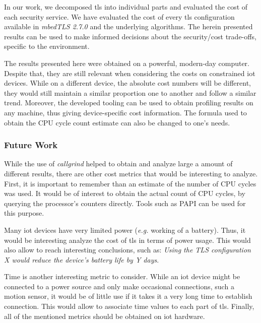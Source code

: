 \documentclass{llncs}
\begin{document}
In our work, we decomposed \gls{tls} into individual parts and evaluated the cost of each security service.
We have evaluated the cost of every \gls{tls} configuration available in \textit{mbedTLS 2.7.0} and the underlying
algorithms. The herein presented results can be used to make informed decisions about the security/cost trade-offs,
specific to the environment.

The results presented here were obtained on a powerful, modern-day computer. Despite that, they are still
relevant when considering the costs on constrained \gls{iot} devices. While on a different device, the absolute cost 
numbers will be different, they would still maintain a similar proportion one to another and follow a similar trend.
Moreover, the developed tooling can be used to obtain profiling results on any machine, thus giving device-specific 
cost information. The formula used to obtain the CPU cycle count estimate can also be changed to one's needs.

\subsubsection{Future Work}

While the use of \textit{callgrind} helped to obtain and analyze large a amount of different results, there are other
cost metrics that would be interesting to analyze. First, it is important to remember than an estimate of the number
of CPU cycles was used. It would be of interest to obtain the actual count of CPU cycles, by querying the
processor's counters directly. Tools such as PAPI\cite{dongarra2001using} can be used for this purpose.

Many \gls{iot} devices have very limited power (\textit{e.g.} working of a battery). Thus, it would be interesting
analyze the cost of \gls{tls} in terms of power usage. This would also allow to reach interesting conclusions, such as:
\textit{Using the TLS configuration X would reduce the device's battery life by Y days}.

Time is another interesting metric to consider. While an \gls{iot} device might be connected to a power source and
only make occasional connections, such a motion sensor, it would be of little use if it takes it a very long time
to establish connection. This would allow to associate time values to each part of \gls{tls}.
Finally, all of the mentioned metrics should be obtained on \gls{iot} hardware.

%
\nocite{*}


%
\printglossary[style=long]
%
\end{document}
